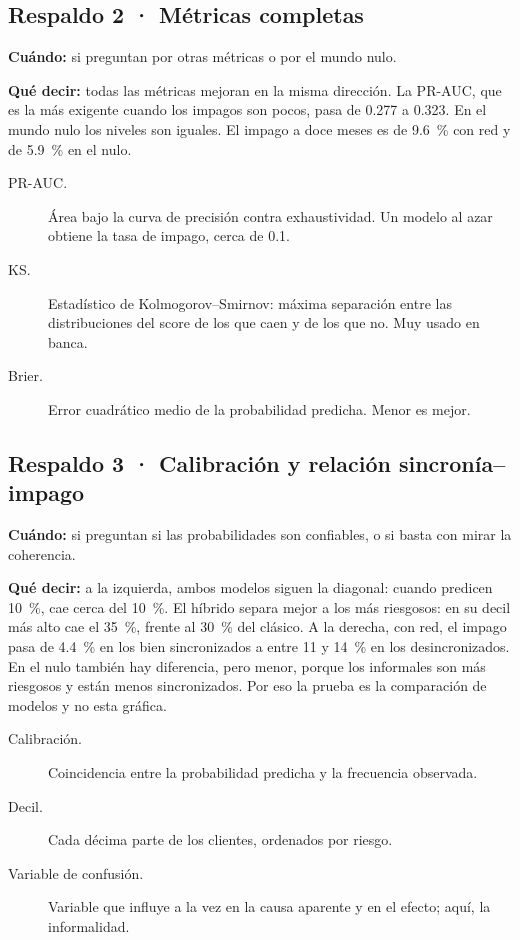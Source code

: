 \subsection*{Respaldo 2 · Métricas completas}
\textbf{Cuándo:} si preguntan por otras métricas o por el mundo nulo.

\textbf{Qué decir:} todas las métricas mejoran en la misma dirección. La PR-AUC, que es
la más exigente cuando los impagos son pocos, pasa de 0.277 a 0.323. En el mundo nulo los
niveles son iguales. El impago a doce meses es de 9.6~\% con red y de 5.9~\% en el nulo.

\begin{terminos}
\begin{description}
\item[PR-AUC.] Área bajo la curva de precisión contra exhaustividad. Un modelo al azar
obtiene la tasa de impago, cerca de 0.1.
\item[KS.] Estadístico de Kolmogorov–Smirnov: máxima separación entre las distribuciones
del score de los que caen y de los que no. Muy usado en banca.
\item[Brier.] Error cuadrático medio de la probabilidad predicha. Menor es mejor.
\end{description}
\end{terminos}

\subsection*{Respaldo 3 · Calibración y relación sincronía–impago}
\textbf{Cuándo:} si preguntan si las probabilidades son confiables, o si basta con mirar
la coherencia.

\textbf{Qué decir:} a la izquierda, ambos modelos siguen la diagonal: cuando predicen
10~\%, cae cerca del 10~\%. El híbrido separa mejor a los más riesgosos: en su decil más
alto cae el 35~\%, frente al 30~\% del clásico. A la derecha, con red, el impago pasa de
4.4~\% en los bien sincronizados a entre 11 y 14~\% en los desincronizados. En el nulo
también hay diferencia, pero menor, porque los informales son más riesgosos y están menos
sincronizados. Por eso la prueba es la comparación de modelos y no esta gráfica.

\begin{terminos}
\begin{description}
\item[Calibración.] Coincidencia entre la probabilidad predicha y la frecuencia
observada.
\item[Decil.] Cada décima parte de los clientes, ordenados por riesgo.
\item[Variable de confusión.] Variable que influye a la vez en la causa aparente y en el
efecto; aquí, la informalidad.
\end{description}
\end{terminos}

